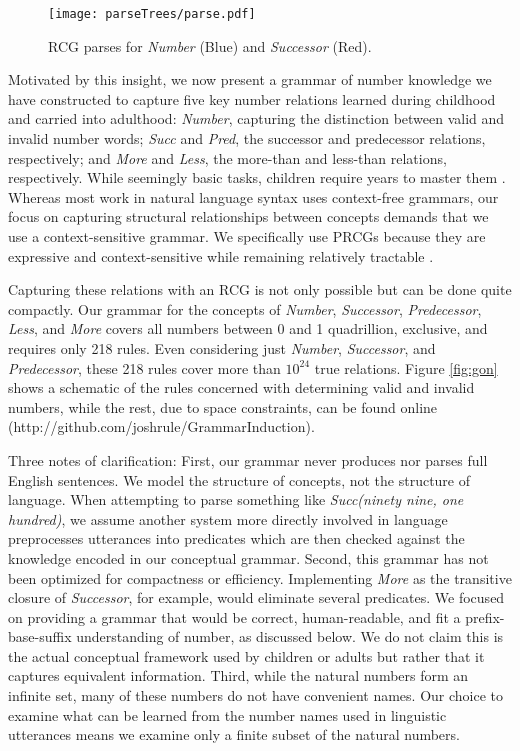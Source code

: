 \documentclass[10pt,letterpaper]{article}
\begin{document}
\begin{figure}[t]
  \begin{centering}
    \texttt{[image: parseTrees/parse.pdf]}
    \caption{RCG parses for \emph{Number} (Blue) and \emph{Successor} (Red).}
    \label{fig:parse}
  \end{centering}
\end{figure}

Motivated by this insight, we now present a grammar of number
knowledge we have constructed to capture five key number relations
learned during childhood and carried into adulthood: \emph{Number},
capturing the distinction between valid and invalid number words;
\emph{Succ} and \emph{Pred}, the successor and predecessor relations,
respectively; and \emph{More} and \emph{Less}, the more-than and
less-than relations, respectively. While seemingly basic tasks,
children require years to master them \citep{FusRicBriar1982}. Whereas
most work in natural language syntax uses context-free grammars, our
focus on capturing structural relationships between concepts demands
that we use a context-sensitive grammar. We specifically use PRCGs
because they are expressive and context-sensitive while remaining
relatively tractable \citep{boullier2005range}.

Capturing these relations with an RCG is not only possible but can be
done quite compactly. Our grammar for the concepts of \emph{Number},
\emph{Successor}, \emph{Predecessor}, \emph{Less}, and \emph{More}
covers all numbers between 0 and 1 quadrillion, exclusive, and
requires only 218 rules. Even considering just \emph{Number},
\emph{Successor}, and \emph{Predecessor}, these 218 rules cover more
than $10^{24}$ true relations. Figure \ref{fig:gon} shows a schematic of
the rules concerned with determining valid and invalid numbers, while
the rest, due to space constraints, can be found online
(http://github.com/joshrule/GrammarInduction).

Three notes of clarification: First, our grammar never produces nor
parses full English sentences. We model the structure of concepts, not
the structure of language. When attempting to parse something like
\emph{Succ(ninety nine, one hundred)}, we assume another system more
directly involved in language preprocesses utterances into predicates
which are then checked against the knowledge encoded in our conceptual
grammar. Second, this grammar has not been optimized for compactness
or efficiency. Implementing \emph{More} as the transitive closure of
\emph{Successor}, for example, would eliminate several predicates. We
focused on providing a grammar that would be correct, human-readable,
and fit a prefix-base-suffix understanding of number, as discussed
below. We do not claim this is the actual conceptual framework used by
children or adults but rather that it captures equivalent information.
Third, while the natural numbers form an infinite set, many of these
numbers do not have convenient names. Our choice to examine what can
be learned from the number names used in linguistic utterances means
we examine only a finite subset of the natural numbers.
\end{document}
